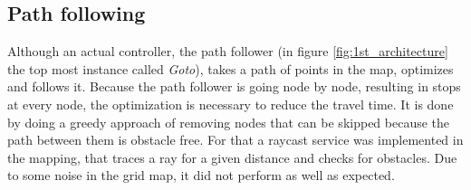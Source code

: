 \subsection{Path following}
Although an actual controller, the path follower (in figure \ref{fig:1st_architecture} the top most instance called \textit{Goto}),
takes a path of points in the map, optimizes and follows it.
Because the path follower is going node by node, resulting in stops at every node, the optimization is necessary to reduce the travel time.
It is done by doing a greedy approach of removing nodes that can be skipped because the path between them is obstacle free.
For that a raycast service was implemented in the mapping, that traces a ray for a given distance and checks for obstacles.
Due to some noise in the grid map, it did not perform as well as expected.